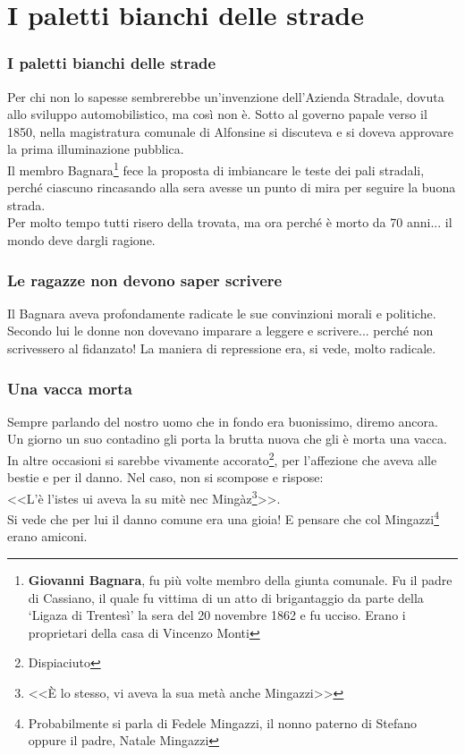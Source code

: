 
\chapter{I paletti bianchi delle strade}
\subsection{I paletti bianchi delle strade}
Per chi non lo sapesse sembrerebbe un'invenzione dell'Azienda Stradale, dovuta allo sviluppo automobilistico, ma così non è. Sotto al governo papale verso il 1850, nella magistratura comunale di Alfonsine si discuteva e si doveva approvare la prima illuminazione pubblica.\\
\indent Il membro Bagnara\footnote{\textbf{Giovanni Bagnara}, fu più volte membro della giunta comunale. Fu il padre di Cassiano, il quale fu vittima di un atto di brigantaggio  da parte della `Ligaza di Trentesì' la sera del 20 novembre 1862 e fu ucciso. Erano i proprietari della casa di Vincenzo Monti} fece la proposta di imbiancare le teste dei pali stradali, perché ciascuno rincasando alla sera avesse un punto di mira per seguire la buona strada.\\
\indent Per molto tempo tutti risero della trovata, ma ora perché è morto da 70 anni... il mondo deve dargli ragione.

\subsection{Le ragazze non devono saper scrivere}
Il Bagnara aveva profondamente radicate le sue convinzioni morali e politiche. Secondo lui le donne non dovevano imparare a leggere e scrivere... perché non scrivessero al fidanzato! La maniera di repressione era, si vede, molto radicale.\\

\subsection{Una vacca morta}
Sempre parlando del nostro uomo che in fondo era buonissimo, diremo ancora.\\
\indent Un giorno un suo contadino gli porta la brutta nuova che gli è morta una vacca. In altre occasioni si sarebbe vivamente accorato\footnote{Dispiaciuto}, per l'affezione che aveva alle bestie e per il danno. Nel caso, non si scompose e rispose:\\
\indent <<L'è l'istes ui aveva la su mitè nec Mingàz\footnote{<<È lo stesso, vi aveva la sua metà anche Mingazzi>>}>>. \\
\indent Si vede che per lui il danno comune era una gioia! E pensare che col Mingazzi\footnote{Probabilmente si parla di Fedele Mingazzi, il nonno paterno di Stefano oppure il padre, Natale Mingazzi} erano amiconi.


